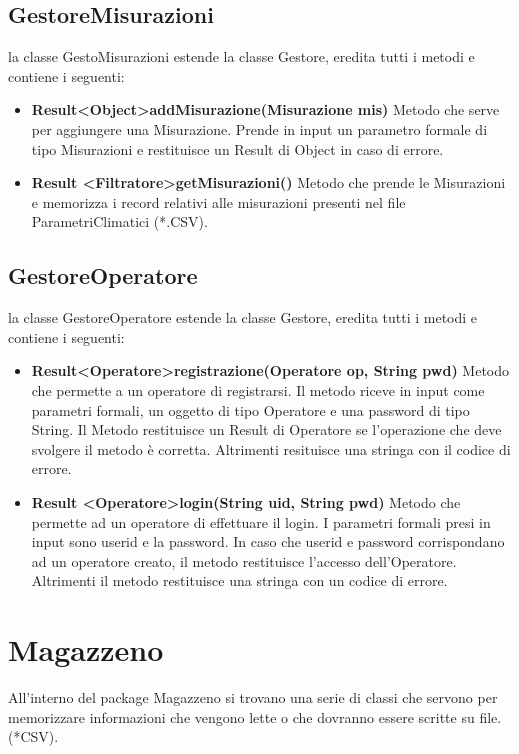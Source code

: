 \documentclass[a4paper, 12pt]{report}
\begin{document}
			\subsection{GestoreMisurazioni}
			la classe GestoMisurazioni estende la classe Gestore, eredita tutti i metodi e contiene i seguenti:
			\begin{itemize}
				\item \textbf{Result\textless Object\textgreater addMisurazione(Misurazione mis)}
				Metodo che serve per aggiungere una Misurazione. Prende in input un parametro formale di tipo Misurazioni e restituisce un Result di Object in caso di errore.
				
				\item \textbf {Result \textless Filtratore\textgreater getMisurazioni()}
				Metodo che prende le Misurazioni e memorizza i record relativi alle misurazioni presenti nel file ParametriClimatici (*.CSV).
			\end{itemize}

			\subsection{GestoreOperatore}
			la classe GestoreOperatore estende la classe Gestore, eredita tutti i metodi e contiene i seguenti:
			\begin{itemize}
				\item \textbf{Result\textless Operatore\textgreater registrazione(Operatore op, String pwd)}
				Metodo che permette a un operatore di registrarsi. Il metodo riceve in input come parametri formali, un oggetto di tipo Operatore e una password di tipo String. Il Metodo restituisce un Result di Operatore se l'operazione che deve svolgere il metodo è corretta. Altrimenti resituisce una stringa con il codice di errore.
				\item \textbf{Result \textless Operatore\textgreater login(String uid, String pwd)}
				Metodo che permette ad un operatore di effettuare il login. I parametri formali presi in input sono userid e la password. In caso che userid e password corrispondano ad un operatore creato, il metodo restituisce l'accesso dell'Operatore. Altrimenti il metodo restituisce una stringa con un codice di errore. 
			\end{itemize}





		\section{Magazzeno}
		All'interno del package Magazzeno si trovano una serie di classi che servono per memorizzare informazioni che vengono lette o che dovranno essere scritte su file.(*CSV).
\end{document}

